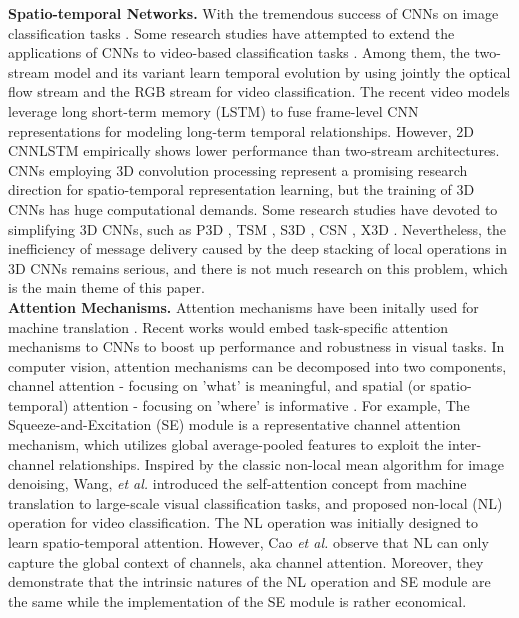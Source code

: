 \documentclass[a4paper,conference]{IEEEtran}
\begin{document}
\noindent \textbf{Spatio-temporal Networks.} With the tremendous success of CNNs on image classification tasks \cite{he2016deep,krizhevsky2012imagenet,Simonyan15,szegedy2015going,szegedy2016rethinking,inception_v4,xie2017aggregated,huang2017densely,tan2019efficientnet}. Some research studies have attempted to extend the applications of CNNs to video-based classification tasks \cite{simonyan2014two, yue2015beyond, carreira2017quo, li2018videolstm, huang2020learning}. Among them, the two-stream model \cite{simonyan2014two} and its variant \cite{wang2016temporal} learn temporal evolution by using jointly the optical flow stream and the RGB stream for video classification. The recent video models \cite{yue2015beyond,donahue2015long,carreira2017quo,li2018videolstm} leverage long short-term memory (LSTM) to fuse frame-level CNN representations for modeling long-term temporal relationships. However, 2D CNNLSTM \cite{carreira2017quo} empirically shows lower performance than two-stream architectures.
CNNs employing 3D convolution processing \cite{taylor2010convolutional,tran2015learning,carreira2017quo} represent a promising research direction for spatio-temporal representation learning, but the training of 3D CNNs has huge computational demands. Some research studies have devoted to simplifying 3D CNNs, such as P3D \cite{qiu2017learning}, TSM \cite{lin2019tsm}, S3D \cite{xie2018rethinking}, CSN \cite{tran2019video},  X3D \cite{feichtenhofer2020x3d}. Nevertheless, the inefficiency of message delivery caused by the deep stacking of local operations in 3D CNNs remains serious, and there is not much research on this problem, which is the main theme of this paper. \\

\noindent \textbf{Attention Mechanisms.} Attention mechanisms have been initally used for machine translation \cite{bahdanau2015neural}. Recent works \cite{Hu_2018_CVPR, wang2017residual, wang2018non, woo2018cbam} would embed task-specific attention mechanisms to CNNs to boost up performance and robustness in visual tasks. In computer vision, attention mechanisms can be decomposed into two components, channel attention - focusing on 'what' is meaningful, and spatial (or spatio-temporal) attention - focusing on 'where' is informative \cite{woo2018cbam}. For example, The Squeeze-and-Excitation (SE) module is a representative channel attention mechanism, which utilizes global average-pooled features to exploit the inter-channel relationships. Inspired by the classic non-local mean algorithm \cite{buades2005non} for image denoising, Wang, {\em et al.} \cite{wang2018non} introduced the self-attention concept  \cite{vaswani2017attention} from machine translation to large-scale visual classification tasks, and proposed non-local (NL) operation for video classification. The NL operation was initially designed to learn spatio-temporal attention. However, Cao {\em et al.} \cite{cao2019gcnet} observe that NL can only capture the global context of channels, aka channel attention. Moreover, they demonstrate that the intrinsic natures of the NL operation and SE module \cite{Hu_2018_CVPR} are the same while the implementation of the SE module is rather economical.
\end{document}

